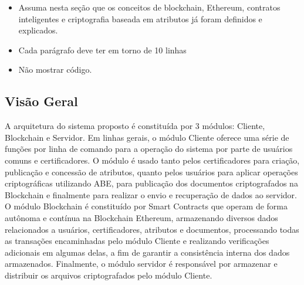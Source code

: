 \documentclass[a4paper,11pt]{article}
\begin{document}
\begin{itemize}
    \item {\color{red} Assuma nesta seção que os conceitos de blockchain, Ethereum, contratos inteligentes e criptografia baseada em atributos já foram definidos e explicados.}

    \item {\color{red}Cada parágrafo deve ter em torno de 10 linhas}

    \item {\color{red}Não mostrar código.}

\end{itemize}

\subsection{Visão Geral}
\label{sec:sub:visaogeral}


A arquitetura do sistema proposto é constituída por 3 módulos: Cliente, Blockchain e Servidor.
Em linhas gerais, o módulo Cliente oferece uma série de funções por linha de comando para a operação do sistema por parte de usuários comuns e certificadores.
O módulo é usado tanto pelos certificadores para criação, publicação e concessão de atributos, quanto pelos usuários para aplicar operações criptográficas utilizando ABE, para publicação dos documentos criptografados na Blockchain e finalmente para realizar o envio e recuperação de dados ao servidor.
O módulo Blockchain é constituído por Smart Contracts que operam de forma autônoma e contínua na Blockchain Ethereum, armazenando diversos dados relacionados a usuários, certificadores, atributos e documentos, processando todas as transações encaminhadas pelo módulo Cliente e realizando verificações adicionais em algumas delas, a fim de garantir a consistência interna dos dados armazenados.
Finalmente, o módulo servidor é responsável por armazenar e distribuir os arquivos criptografados pelo módulo Cliente.

\end{document}
